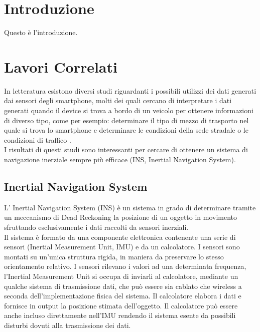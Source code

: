 \documentclass[12pt,a4paper,openright,twoside]{report}
\begin{document}
\chapter{Introduzione}                %
\lhead[\fancyplain{}{\bfseries\thepage}]{\fancyplain{}{\bfseries\rightmark}}
Questo \`e l'introduzione.



\clearpage{\pagestyle{empty}\cleardoublepage}
\chapter{Lavori Correlati}                %
\lhead[\fancyplain{}{\bfseries\thepage}]{\fancyplain{}{\bfseries\rightmark}}
In letteratura esistono diversi studi riguardanti i possibili utilizzi dei dati generati dai sensori degli smartphone, molti dei quali cercano di interpretare i dati generati quando il device si trova a bordo di un veicolo per ottenere informazioni di diverso tipo, come per esempio: determinare il tipo di mezzo di trasporto nel quale si trova lo smartphone \cite{K1, K2, K3, K4} e determinare le condizioni della sede stradale o le condizioni di traffico \cite{K5, K6}. \\

I risultati di questi studi sono interessanti per cercare di ottenere un sistema di navigazione inerziale sempre più efficace (INS, Inertial Navigation System).

\section{Inertial Navigation System}
L' Inertial Navigation System (INS) è un sistema in grado di determinare tramite un meccanismo di Dead Reckoning la posizione di un oggetto in movimento sfruttando esclusivamente i dati raccolti da sensori inerziali.\\

Il sistema è formato da una componente elettronica contenente una serie di sensori (Inertial Measurement Unit, IMU) e da un calcolatore. 
I sensori sono montati su un'unica struttura rigida, in maniera da preservare lo stesso orientamento relativo. I sensori rilevano i valori ad una determinata frequenza, l'Inertial Measurement Unit si occupa di inviarli al calcolatore, mediante un qualche sistema di trasmissione dati, che può essere sia cablato che wireless a seconda dell'implementazione fisica del sistema. Il calcolatore elabora i dati e fornisce in output la posizione stimata dell'oggetto. Il calcolatore può essere anche incluso direttamente nell'IMU rendendo il sistema esente da possibili disturbi dovuti alla trasmissione dei dati.
\end{document}
